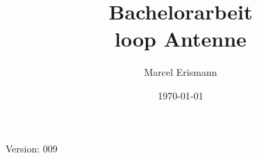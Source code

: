 \documentclass[10pt,a4paper]{article}
\author{Marcel Erismann}
\date{\today}
\title{Bachelorarbeit \\ \footnotesize{loop Antenne}}
\begin{document}
	
	Version: 009
	\tableofcontents 
	\newpage
	
\end{document}
